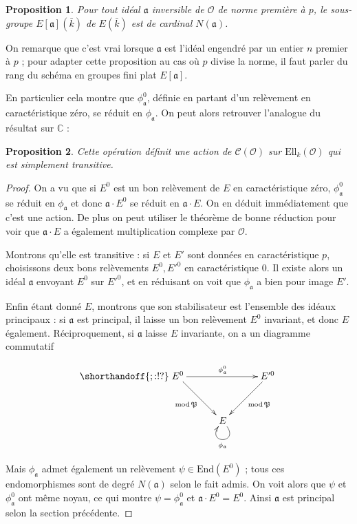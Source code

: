 \documentclass[11pt,a4paper]{article}
\newcommand{\C}{\mathbb{C}}
\renewcommand{\O}{\mathcal{O}}
\newcommand{\Cl}{\mathcal{C}}
\newcommand{\End}{\mathrm{End}}
\newcommand{\Ell}{\mathrm{Ell}}
\renewcommand{\frak}{\mathfrak}
\newtheorem*{prop}{Proposition}
\theoremstyle{definition}
\begin{document}
\begin{prop}

Pour tout idéal $\frak a$ inversible de $\O$ de norme première à $p$, le sous-groupe $E[\frak a](\bar{k})$ de $ E(\bar{k})$ est de cardinal $N(\frak a)$.

\end{prop}

On remarque que c'est vrai lorsque $\frak a$ est l'idéal engendré par un entier $n$ premier à $p$ ; pour adapter cette proposition au cas où $p$ divise la norme, il faut parler du rang du schéma en groupes fini plat $E[\frak a]$.

En particulier cela montre que $\phi_{\frak a}^0$, définie en partant d'un relèvement en caractéristique zéro, se réduit en $\phi_{\frak a}$. On peut alors retrouver l'analogue du résultat sur $\C$ :

\begin{prop}

Cette opération définit une action de $\Cl(\O)$ sur $\Ell_k(\O)$ qui est simplement transitive.

\end{prop}

\begin{proof}

On a vu que si $E^0$ est un bon relèvement de $E$ en caractéristique zéro, $\phi_{\frak a}^0$ se réduit en $\phi_{\frak a}$ et donc $\frak a\cdot E^0$ se réduit en $\frak a\cdot E$. On en déduit immédiatement que c'est une action. De plus on peut utiliser le théorème de bonne réduction pour voir que $\frak a\cdot E$ a également multiplication complexe par $\O$.

Montrons qu'elle est transitive : si $E$ et $E'$ sont données en caractéristique $p$, choisissons deux bons relèvements $E^0, E'^0$ en caractéristique 0. Il existe alors un idéal $\frak a$ envoyant $E^0$ sur $E'^0$, et en réduisant on voit que $\phi_{\frak a}$ a bien pour image $E'$.

Enfin étant donné $E$, montrons que son stabilisateur est l'ensemble des idéaux principaux : si $\frak a$ est principal, il laisse un bon relèvement $E^0$ invariant, et donc $E$ également. Réciproquement, si $\frak a$ laisse $E$ invariante, on a un diagramme commutatif

$$
\shorthandoff{;:!?}
\xymatrix @!=8mm {
E^0 \ar[rr]^{\phi_{\frak a}^0} \ar[rd]_{\mathrm{mod}\,\frak P} & & E'^0 \ar[ld]^{\mathrm{mod}\,\frak P} \\
 & E \ar@(dr,dl)^{\phi_{\frak a}} & 
}
$$

Mais $\phi_{\frak a}$ admet également un relèvement $\psi\in \End(E^0)$ ; tous ces endomorphismes sont de degré $N(\frak a)$ selon le fait admis. On voit alors que $\psi$ et $\phi_{\frak a}^0$ ont même noyau, ce qui montre $\psi=\phi_{\frak a}^0$ et $\frak a\cdot E^0 = E^0$. Ainsi $\frak a$ est principal selon la section précédente.
\end{proof}
\end{document}
